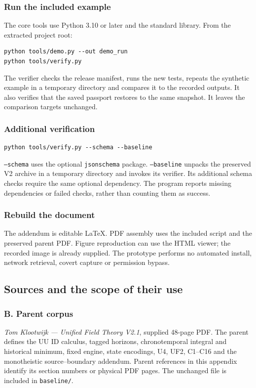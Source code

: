 \documentclass[11pt,a4paper]{article}
\newcommand{\newpagehead}[1]{\clearpage\subsection{#1}}
\begin{document}
\subsubsection{Run the included example}
The core tools use Python 3.10 or later and the standard library. From the extracted project root:
\begin{lstlisting}
python tools/demo.py --out demo_run
python tools/verify.py
\end{lstlisting}
The verifier checks the release manifest, runs the new tests, repeats the synthetic example in a temporary directory and compares it to the recorded outputs. It also verifies that the saved passport restores to the same snapshot. It leaves the comparison targets unchanged.

\subsubsection{Additional verification}
\begin{lstlisting}
python tools/verify.py --schema --baseline
\end{lstlisting}
\texttt{--schema} uses the optional \texttt{jsonschema} package. \texttt{--baseline} unpacks the preserved V2 archive in a temporary directory and invokes its verifier. Its additional schema checks require the same optional dependency. The program reports missing dependencies or failed checks, rather than counting them as success.

\subsubsection{Rebuild the document}
The addendum is editable LaTeX. PDF assembly uses the included script and the preserved parent PDF. Figure reproduction can use the HTML viewer; the recorded image is already supplied. The prototype performs no automated install, network retrieval, covert capture or permission bypass.

\newpagehead{Sources and the scope of their use}
\subsubsection{B. Parent corpus}
\emph{Tom Klootwijk --- Unified Field Theory V2.1}, supplied 48-page PDF. The parent defines the UU ID calculus, tagged horizons, chronotemporal integral and historical minimum, fixed engine, state encodings, U4, UF2, C1--C16 and the monotheistic source--boundary addendum. Parent references in this appendix identify its section numbers or physical PDF pages. The unchanged file is included in \texttt{baseline/}.
\end{document}
